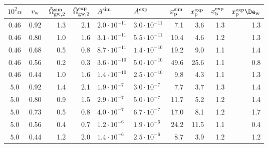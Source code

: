 \begin{tabular}{cc | rr | ll | rr | rr}
\hline\hline
$10^2\alpha$ & $v_{\rm w}$ & $\tilde\Omega_{\rm gw,2}^{\rm sim}$ & $\tilde\Omega_{\rm gw,2}^{\rm exp}$ & \hspace{1em} $A^{\rm sim}$ & \hspace{1em} $A^{\rm exp}$ & $x_{\rm p}^{\rm sim}$ & $x_{\rm p}^{\rm exp}$ & $x_{\rm b}^{\rm exp}$ & $x_{\rm p}^{\rm exp}\De_\text{w}$ \\
\hline
$ 0.46 $ & 0.92 & 1.3 & 2.1 & $ 2.0\cdot 10^{-11} $ & $ 3.0\cdot 10^{-11} $ &  7.1 &  3.6 & 1.3 & 1.3 \\
$ 0.46 $ & 0.80 & 1.0 & 1.6 & $ 3.1\cdot 10^{-11} $ & $ 5.5\cdot 10^{-11} $ & 10.4 &  4.6 & 1.2 & 1.3 \\
$ 0.46 $ & 0.68 & 0.5 & 0.8 & $ 8.7\cdot 10^{-11} $ & $ 1.4\cdot 10^{-10} $ & 19.2 &  9.0 & 1.1 & 1.4 \\
$ 0.46 $ & 0.56 & 0.2 & 0.3 & $ 3.6\cdot 10^{-10} $ & $ 5.0\cdot 10^{-10} $ & 49.6 & 25.6 & 1.1 & 0.8 \\
$ 0.46 $ & 0.44 & 1.0 & 1.6 & $ 1.4\cdot 10^{-10} $ & $ 2.5\cdot 10^{-10} $ &  9.8 &  4.3 & 1.1 & 1.3 \\
$ 5.0 $ & 0.92 & 1.4 & 2.1 & $ 1.9\cdot 10^{-7} $ & $ 3.0\cdot 10^{-7} $ &  7.7 &  3.7 & 1.3 & 1.4 \\
$ 5.0 $ & 0.80 & 0.9 & 1.5 & $ 2.9\cdot 10^{-7} $ & $ 5.0\cdot 10^{-7} $ & 11.7 &  5.2 & 1.2 & 1.4 \\
$ 5.0 $ & 0.73 & 0.5 & 0.8 & $ 4.0\cdot 10^{-7} $ & $ 6.7\cdot 10^{-7} $ & 17.0 &  8.1 & 1.2 & 1.7 \\
$ 5.0 $ & 0.56 & 0.4 & 0.7 & $ 1.2\cdot 10^{-6} $ & $ 1.9\cdot 10^{-6} $ & 24.2 & 11.5 & 1.1 & 0.4 \\
$ 5.0 $ & 0.44 & 1.2 & 2.0 & $ 1.4\cdot 10^{-6} $ & $ 2.5\cdot 10^{-6} $ &  8.7 &  3.9 & 1.2 & 1.2 \\
\hline\hline
\end{tabular}
